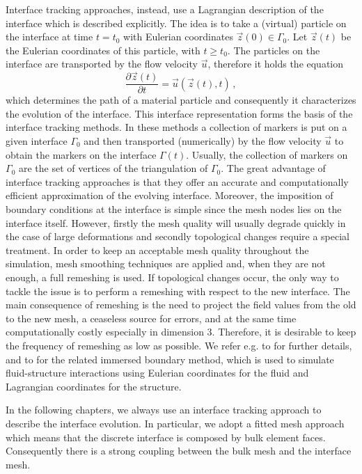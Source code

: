 Interface tracking approaches, instead, use a Lagrangian description of the
interface which is described explicitly. The idea is to take a (virtual)
particle on the interface at time $t=t_0$ with Eulerian coordinates $\vec z(0)
\in \Gamma_0$. Let $\vec z(t)$ be the Eulerian coordinates of this particle,
with $t\geq t_0$. The particles on the interface are transported by the flow
velocity $\vec u$, therefore it holds the equation
\begin{equation}
\frac{\partial \vec z(t)}{\partial t}=\vec u(\vec z(t),t)\,,
\end{equation}
which determines the path of a material particle and consequently it
characterizes the evolution of the interface. This interface representation
forms the basis of the interface tracking methods. In these methods a
collection of markers is put on a given interface $\Gamma_0$ and then
transported (numerically) by the flow velocity $\vec u$ to obtain the markers
on the interface $\Gamma(t)$. Usually, the collection of markers on $\Gamma_0$
are the set of vertices of the triangulation of $\Gamma_0$. The great
advantage of interface tracking approaches is that they offer an accurate and
computationally efficient approximation of the evolving interface. Moreover,
the imposition of boundary conditions at the interface is simple since the mesh
nodes lies on the interface itself. However, firstly the mesh quality will
usually degrade quickly in the case of large deformations and secondly
topological changes require a special treatment. In order to keep an
acceptable mesh quality throughout the simulation, mesh smoothing techniques
are applied and, when they are not enough, a full remeshing is used. If
topological changes occur, the only way to tackle the issue is to
perform a remeshing with respect to the new interface. The main consequence of
remeshing is the need to project the field values from the old to the new
mesh, a ceaseless source for errors, and at the same time computationally
costly especially in dimension 3. Therefore, it is desirable to keep the
frequency of remeshing as low as possible. We refer e.g. to
\cite{UnverdiT92,Bansch01,Tryggvason_etal01,GanesanMT07,GanesanT08,spurious}
for further details, and to \cite{LevequeL97,Peskin02} for the related immersed
boundary method, which is used to simulate fluid-structure interactions using
Eulerian coordinates for the fluid and Lagrangian coordinates for the structure.

In the following chapters, we always use an interface tracking approach to
describe the interface evolution. In particular, we adopt a fitted mesh approach
which means that the discrete interface is composed by bulk element faces.
Consequently there is a strong coupling between the bulk mesh and the interface
mesh.

